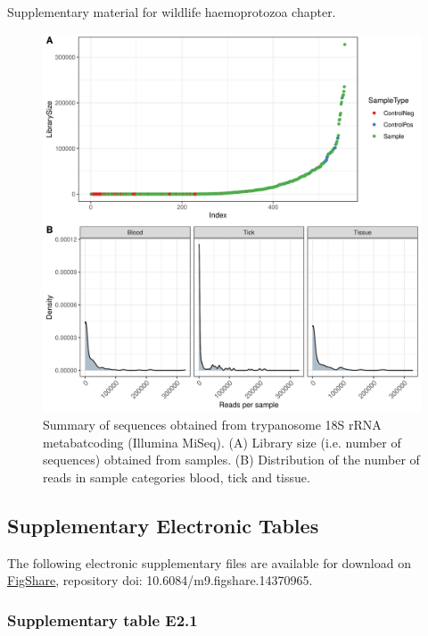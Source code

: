 \documentclass[a4paper, nobind]{templates/ociamthesis}
\begin{document}
Supplementary material for wildlife haemoprotozoa chapter.

\begin{figure}[h]
\includegraphics[width=0.95\linewidth]{figures/ms-figs-appendix/FigA-4.1} \caption[Sequence summary of trypanosome metabarcoding]{Summary of sequences obtained from trypanosome 18S rRNA metabatcoding (Illumina MiSeq). (A) Library size (i.e. number of sequences) obtained from samples. (B) Distribution of the number of reads in sample categories blood, tick and tissue.}\label{fig:FA41}
\end{figure}

\clearpage

\hypertarget{ch4-esupp}{%
\subsection{Supplementary Electronic Tables}\label{ch4-esupp}}

The following electronic supplementary files are available for download on \href{https://figshare.com/s/9eb3dba4096470af9904}{FigShare}, repository doi: 10.6084/m9.figshare.14370965.

\hypertarget{supplementary-table-e2.1}{%
\subsubsection{Supplementary table E2.1}\label{supplementary-table-e2.1}}
\end{document}
